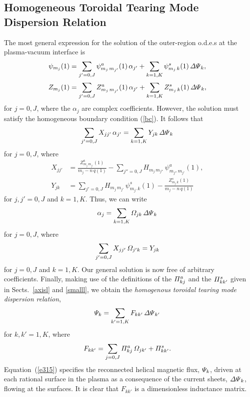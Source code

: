 \documentclass[12pt,prb,aps]{revtex4-1}
\begin{document}
\subsection{Homogeneous Toroidal Tearing Mode Dispersion Relation}\label{disp}
The most general expression for the solution of the outer-region o.d.e.s at the plasma-vacuum interface is
\begin{align}\label{e385}
\psi_{m_j}(1) &= \sum_{j'=0,J}\psi_{m_j\,m_{j'}}^a(1)\,\alpha_{j'} + \sum_{k=1,K}\psi_{m_j\,k}^s(1)\,{\mit\Delta\Psi}_k,\\[0.5ex]
Z_{m_j}(1) &= \sum_{j'=0,J}Z_{m_j\,m_{j'}}^a(1)\,\alpha_{j'} + \sum_{k=1,K}Z_{m_j\,k}^s(1)\,{\mit\Delta\Psi}_k,\label{e386}
\end{align}
for $j=0,J$, where the $\alpha_j$ are complex coefficients. However,  the solution must satisfy the homogeneous boundary condition (\ref{bc}). 
It follows that
\begin{equation}
\sum_{j'=0,J}X_{jj'}\,\alpha_{j'} = \sum_{k=1,K}Y_{jk}\,{\mit\Delta\Psi}_k
\end{equation}
for $j=0,J$, where
\begin{align}
X_{jj'} &=\frac{Z_{m_j\,m_{j'}}^{a}(1)}{m_j-n\,q(1)}-\sum_{j''=0,J}H_{m_j\,m_{j''}}\,\psi_{m_{j''}\,m_{j'}}^a(1),\\[0.5ex]
Y_{jk} &= \sum_{j'=0,J}H_{m_j\,m_{j'}}\,\psi_{m_{j'}\,k}^{s}(1)-
\frac{Z_{m_j\,k}^s(1)}{m_j-n\,q(1)}
\end{align}
for $j,j'=0,J$ and $k=1,K$. Thus, we can write
\begin{equation}
\alpha_j = \sum_{k=1,K}{\mit\Omega}_{jk}\,{\mit\Delta\Psi}_k
\end{equation}
for $j=0,J$, 
where
\begin{equation}
\sum_{j'=0,J}X_{jj'}\,{\mit\Omega}_{j'k} = Y_{jk}
\end{equation}
for $j=0,J$ and $k=1,K$. Our general solution is now free of arbitrary coefficients.
 Finally, making use of the definitions of the ${\mit\Pi}_{kj}^a$ and the ${\mit\Pi}_{kk'}^s$ given in Sects.~\ref{axisl} and \ref{smalll}, we obtain the {\em homogenous toroidal tearing mode dispersion relation},\cite{connor,cht,am1,pletz}
\begin{equation}\label{e315}
{\mit\Psi}_k = \sum_{k'=1,K}F_{kk'}\,{\mit\Delta\Psi}_{k'}
\end{equation}
for $k,k'=1,K$, where
\begin{equation}
F_{kk'}=\sum_{j=0,J}{\mit\Pi}^a_{kj}\,{\mit\Omega}_{jk'} + {\mit\Pi}^s_{kk'}.
\end{equation}
Equation~(\ref{e315}) specifies the reconnected helical magnetic flux, ${\mit\Psi}_k$, driven at each rational surface in the plasma
as a consequence of the current sheets, ${\mit\Delta\Psi}_k$, flowing at the surfaces. It is clear that $F_{kk'}$ is a dimensionless
inductance matrix.\cite{rfbook}
\end{document}
